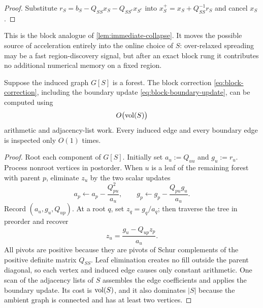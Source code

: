 \begin{proof}
Substitute
$r_S=b_S-Q_{SS}x_S-Q_{SS^c}x_{S^c}$ into
$x_S^+=x_S+Q_{SS}^{-1}r_S$ and cancel $x_S$.
\end{proof}

This is the block analogue of \cref{lem:immediate-collapse}.  It moves the
possible source of acceleration entirely into the online choice of $S$:
over-relaxed spreading may be a fast region-discovery signal, but after an
exact block rung it contributes no additional numerical memory on a fixed
region.

\begin{theorem}
\label{thm:forest-resolution}
Suppose the induced graph $G[S]$ is a forest.  The block correction
\cref{eq:block-correction}, including the boundary update
\cref{eq:block-boundary-update}, can be computed using
\begin{equation}
 O\bigl(\operatorname{vol}(S)\bigr)
 \label{eq:forest-resolution-work}
\end{equation}
arithmetic and adjacency-list work.  Every induced edge and every boundary
edge is inspected only $O(1)$ times.
\end{theorem}

\begin{proof}
Root each component of $G[S]$.  Initially set
$a_u:=Q_{uu}$ and $g_u:=r_u$.  Process nonroot vertices in postorder.  When
$u$ is a leaf of the remaining forest with parent $p$, eliminate $z_u$ by
the two scalar updates
\begin{equation}
 a_p\leftarrow a_p-\frac{Q_{pu}^2}{a_u},
 \qquad
 g_p\leftarrow g_p-\frac{Q_{pu}g_u}{a_u}.
 \label{eq:leaf-schur-update}
\end{equation}
Record $(a_u,g_u,Q_{up})$.  At a root $q$, set $z_q=g_q/a_q$; then traverse
the tree in preorder and recover
\begin{equation}
 z_u=\frac{g_u-Q_{up}z_p}{a_u}.
 \label{eq:forest-back-substitution}
\end{equation}
All pivots are positive because they are pivots of Schur complements of the
positive definite matrix $Q_{SS}$.  Leaf elimination creates no fill outside
the parent diagonal, so each vertex and induced edge causes only constant
arithmetic.  One scan of the adjacency lists of $S$ assembles the edge
coefficients and applies the boundary update.  Its cost is $\operatorname{vol}(S)$, and it
also dominates $|S|$ because the ambient graph is connected and has at least
two vertices.
\end{proof}

